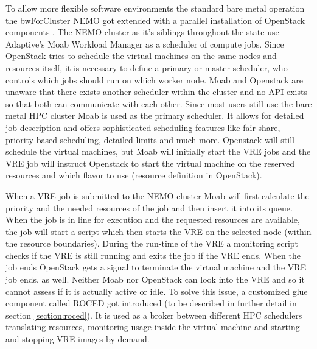 To allow more flexible software environments the standard bare metal operation
the bwForCluster NEMO got extended with a parallel installation of OpenStack
components \cite{hpc-symp:2016}. The NEMO cluster as it's siblings throughout
the state use Adaptive's Moab Workload Manager as a scheduler of compute jobs.
Since OpenStack tries to schedule the virtual machines on the same nodes and
resources itself, it is necessary to define a primary or master scheduler, who
controls which jobs should run on which worker node. Moab and Openstack are
unaware that there exists another scheduler within the cluster and no API exists
so that both can communicate with each other. Since most users still use the
bare metal HPC cluster Moab is used as the primary scheduler. It allows for
detailed job description and offers sophisticated scheduling features like
fair-share, priority-based scheduling, detailed limits and much more. Openstack
will still schedule the virtual machines, but Moab will initially start the VRE
jobs and the VRE job will instruct Openstack to start the virtual machine on the
reserved resources and which flavor to use (resource definition in OpenStack).

When a VRE job is submitted to the NEMO cluster Moab will first calculate the
priority and the needed resources of the job and then insert it into its queue.
When the job is in line for execution and the requested resources are available,
the job will start a script which then starts the VRE on the selected node
(within the resource boundaries). During the run-time of the VRE a monitoring
script checks if the VRE is still running and exits the job if the VRE ends.
When the job ends OpenStack gets a signal to terminate the virtual machine and
the VRE job ends, as well.  Neither Moab nor OpenStack can look into the VRE and
so it cannot assess if it is actually active or idle. To solve this issue, a
customized glue component called ROCED got introduced (to be described in
further detail in section \ref{section:roced}).  It is used as a broker between
different HPC schedulers translating resources, monitoring usage inside the
virtual machine and starting and stopping VRE images by demand.
